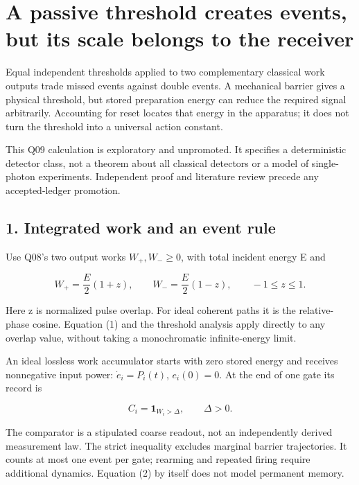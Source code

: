 \documentclass[11pt,a4paper]{article}
\begin{document}
\hypertarget{a-passive-threshold-creates-events-but-its-scale-belongs-to-the-receiver}{%
\section{A passive threshold creates events, but its scale belongs to
the
receiver}\label{a-passive-threshold-creates-events-but-its-scale-belongs-to-the-receiver}}

Equal independent thresholds applied to two complementary classical work
outputs trade missed events against double events. A mechanical barrier
gives a physical threshold, but stored preparation energy can reduce the
required signal arbitrarily. Accounting for reset locates that energy in
the apparatus; it does not turn the threshold into a universal action
constant.

This Q09 calculation is exploratory and unpromoted. It specifies a
deterministic detector class, not a theorem about all classical
detectors or a model of single-photon experiments. Independent proof and
literature review precede any accepted-ledger promotion.

\hypertarget{integrated-work-and-an-event-rule}{%
\subsection{1. Integrated work and an event
rule}\label{integrated-work-and-an-event-rule}}

Use Q08's two output works \(W_+,W_-\ge0\), with total incident energy E
and

\[W_+=\frac E2(1+z),\qquad W_-=\frac E2(1-z),\qquad -1\le z\le1. \tag{1}\]

Here z is normalized pulse overlap. For ideal coherent paths it is the
relative-phase cosine. Equation (1) and the threshold analysis apply
directly to any overlap value, without taking a monochromatic
infinite-energy limit.

An ideal lossless work accumulator starts with zero stored energy and
receives nonnegative input power: \(\dot e_i=P_i(t)\), \(e_i(0)=0\). At
the end of one gate its record is

\[C_i=\mathbf1_{W_i>\Delta},\qquad \Delta>0. \tag{2}\]

The comparator is a stipulated coarse readout, not an independently
derived measurement law. The strict inequality excludes marginal barrier
trajectories. It counts at most one event per gate; rearming and
repeated firing require additional dynamics. Equation (2) by itself does
not model permanent memory.
\end{document}
